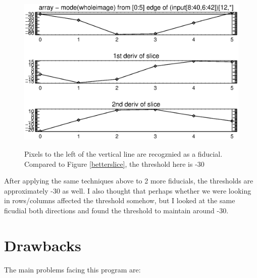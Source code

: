 \documentclass[10pt]{article}
\begin{document}
\begin{figure}[!ht]
{        \includegraphics[width=0.5\linewidth, height = .34\textheight, keepaspectratio=true]{../plots_tables_images/anotherslice6.eps}
        }
        \caption{Pixels to the left of the vertical line are recogznied as a fiducial. Compared to Figure \ref{betterslice}, the threshold here is -30}
        \label{anotherslice}
\end{figure}

After applying the same techniques above to 2 more fiducials, the thresholds are approximately -30 as well. I also thought that perhaps whether we were looking in rows/columns affected the threshold somehow, but I looked at the same ficudial both directions and found the threshold to maintain around -30. 

\section{Drawbacks}

    The main problems facing this program are:
\end{document}
